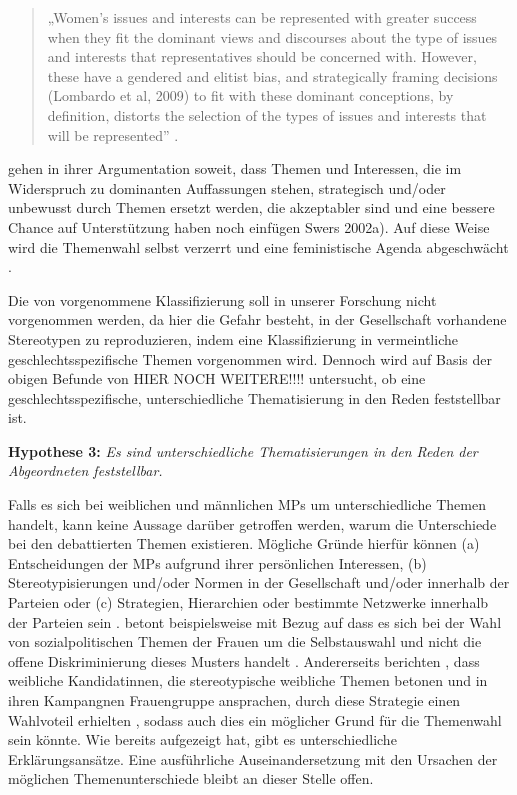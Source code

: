 \documentclass[12pt, 
    twoside=false, 
    bibliography=totoc, 
    numbers=endperiod, 
    headings=normal, 
    toc=chapterentrydotfill
    ]{scrbook}
\begin{document}
\begin{quote}
    „Women’s issues and interests can be represented with greater success when they fit the dominant views and discourses about the type of issues and interests that representatives should be concerned with. However, these have a gendered and elitist bias, and strategically framing decisions (Lombardo et al, 2009) to fit with these dominant conceptions, by definition, distorts the selection of the types of issues and interests that will be represented” \parencite[151]{celis_2018}.
\end{quote}

 \textcite{celis_2018} gehen in ihrer Argumentation soweit, dass Themen und Interessen, die im Widerspruch zu dominanten Auffassungen stehen, strategisch und/oder unbewusst durch Themen ersetzt werden, die akzeptabler sind und eine bessere Chance auf Unterstützung haben \parencites[151]{celis_2018}{swers 2002a} noch einfügen Swers 2002a). Auf diese Weise wird die Themenwahl selbst verzerrt und eine feministische Agenda abgeschwächt \parencite[151]{celis_2018}. 

Die von \textcite{back_2014} vorgenommene Klassifizierung soll in unserer Forschung nicht vorgenommen werden, da hier die Gefahr besteht, in der Gesellschaft vorhandene Stereotypen zu reproduzieren, indem eine Klassifizierung in vermeintliche geschlechtsspezifische Themen vorgenommen wird. Dennoch wird auf Basis der obigen Befunde von \textcites{wangnerud_2000}{wangnerud_2009}{back_2014} HIER NOCH WEITERE!!!! untersucht, ob eine geschlechtsspezifische, unterschiedliche Thematisierung in den Reden feststellbar ist. 

\textbf{Hypothese 3:} \emph{Es sind unterschiedliche Thematisierungen in den Reden der Abgeordneten feststellbar.}


Falls es sich bei weiblichen und männlichen MPs um unterschiedliche Themen handelt, kann keine Aussage darüber getroffen werden, warum die Unterschiede bei den debattierten Themen existieren. Mögliche Gründe hierfür können (a) Entscheidungen der MPs aufgrund ihrer persönlichen Interessen, (b) Stereotypisierungen und/oder Normen in der Gesellschaft und/oder innerhalb der Parteien oder (c) Strategien, Hierarchien oder bestimmte Netzwerke innerhalb der Parteien sein \parencites[507]{back_2014}.
\textcite [250]{ennser-jedenastik_2017} betont beispielsweise mit Bezug auf \textcites{backgaard_2012}{thomas_1994} dass es sich bei der Wahl von sozialpolitischen Themen der Frauen um die Selbstauswahl und nicht die offene Diskriminierung dieses Musters handelt \parencite[250]{ennser-jedenastik_2017}. Andererseits berichten \textcite{herrnson_2003}, dass weibliche Kandidatinnen, die stereotypische weibliche Themen betonen und in ihren Kampangnen Frauengruppe ansprachen, durch diese Strategie einen Wahlvoteil erhielten \parencite[250]{ennser-jedenastik_2017}, sodass auch dies ein möglicher Grund für die Themenwahl sein könnte. Wie \textcite{back_2014} bereits aufgezeigt hat, gibt es unterschiedliche Erklärungsansätze. Eine ausführliche Auseinandersetzung mit den Ursachen der möglichen Themenunterschiede bleibt an dieser Stelle offen.
\end{document}

